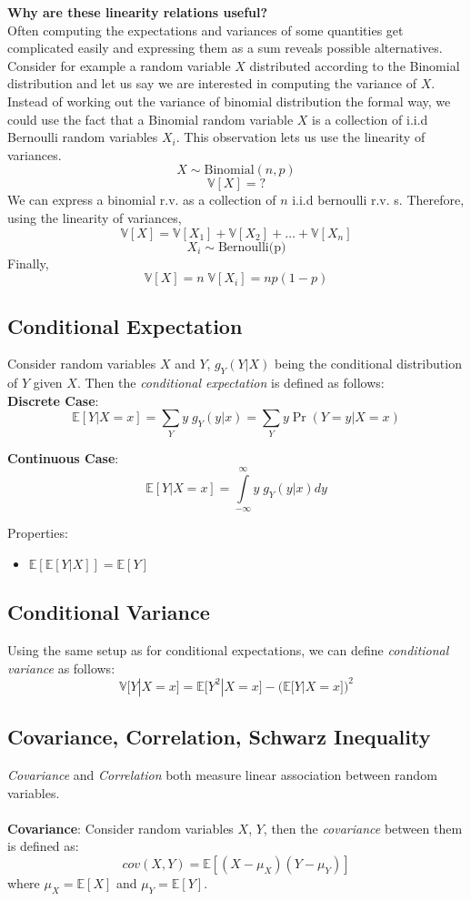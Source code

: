 \documentclass[english, 11pt]{article}
\begin{document}
{\bf Why are these linearity relations useful?}\\
Often computing the expectations and variances of some quantities get complicated easily and expressing them as a sum reveals possible alternatives. Consider for example a random variable $X$ distributed according to the Binomial distribution and let us say we are interested in computing the variance of $X$. Instead of working out the variance of binomial distribution the formal way, we could use the fact that a Binomial random variable $X$ is a collection of i.i.d Bernoulli random variables $X_i$. This observation lets us use the linearity of variances.
\[ X \sim \text{Binomial}(n, p) \]
\[ \mathbb{V}[X] = ? \]
We can express a binomial r.v. as a collection of $n$ i.i.d bernoulli r.v. s. Therefore, using the linearity of variances,
\[ \mathbb{V}[X] = \mathbb{V}[X_1] + \mathbb{V}[X_2] + \ldots + \mathbb{V}[X_n] \]
\[ X_i \sim \text{Bernoulli(p)} \]
Finally, 
\[ \mathbb{V}[X] = n \; \mathbb{V}[X_i]  = n p(1-p) \]

\subsection{Conditional Expectation}
Consider random variables $X$ and $Y$, $g_Y (Y|X)$ being the conditional distribution of $Y$ given $X$. Then the {\it conditional expectation} is defined as follows: \\
{\bf Discrete Case}:
\[ \mathbb{E}[Y | X=x] = \sum_{Y} y \; g_Y (y | x) = \sum_{Y} y \Pr(Y=y | X=x) \]

{\bf Continuous Case}:
\[ \mathbb{E}[Y | X=x] = \int\limits_{-\infty}^{\infty} y \; g_Y (y | x) dy \]

Properties:
\begin{itemize}
\item $\mathbb{E}[\mathbb{E}[Y | X]] = \mathbb{E}[Y]$
\end{itemize}

\subsection{Conditional Variance}
Using the same setup as for conditional expectations, we can define {\it conditional variance} as follows:\\
\[ \mathbb{V}[Y | X = x] = \mathbb{E} \big[Y^2 | X = x \big] - \bigg( \mathbb{E} \big[Y | X = x \big] \bigg)^2\]

\subsection{Covariance, Correlation, Schwarz Inequality}
{\it Covariance} and {\it Correlation} both measure linear association between random variables. \\ \\
{\bf Covariance}: Consider random variables $X$, $Y$, then the {\it covariance} between them is defined as:
\[ cov(X, Y) = \mathbb{E}[(X - \mu_X) (Y - \mu_Y)] \]
where $\mu_X = \mathbb{E}[X]$ and $\mu_Y = \mathbb{E}[Y]$.\\
\end{document}
